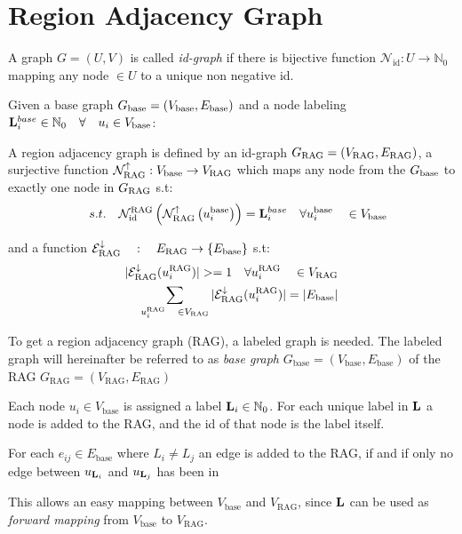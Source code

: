 \chapter{Region Adjacency Graph}\label{ch:regio_adjacency_graph}

    
  \begin{MyDef}[Id-Graph]
    A graph $G = (U, V )$ is called \emph{id-graph} if there is
    bijective function  $\mathcal{N}_{\text{id}}: U \rightarrow \mathbb{N}_0 $ 
    mapping any node $\in U$ to a unique non negative id.
  \end{MyDef}
    

  \begin{MyDef}
    Given a base graph $G_{\text{base}} = (V_{\text{base}}, E_{\text{base}})$ and 
    a node labeling $\mathbf{L}_{i}^{base} \in  \mathbb{N}_0 \quad \forall \quad u_i \in V_{\text{base}}$:

    A region adjacency graph  is defined by an id-graph  $G_{\text{RAG}} = (V_{\text{RAG}}, E_{\text{RAG}})$,
    a surjective function $ \mathcal{N}_{\text{RAG}}^{\uparrow} : V_{\text{base}} \rightarrow V_{\text{RAG}}$ which maps
    any node from the $G_{\text{base}}$ to exactly one node in $G_{\text{RAG}}$ s.t:
    \[
        \quad s.t. \quad
        \mathcal{N}_{\text{id}}^{\text{RAG}} 
        \left(
            \mathcal{N}_{\text{RAG}}^{\uparrow}
            \left(
                u_i^{\text{base}}
            \right)
        \right) 
        = \mathbf{L}_i^{base}
        \quad \forall u_i^{\text{base}} \quad \in V_{\text{base}}
    \]

    and a function $\mathcal{E}_{\text{RAG}}^{\downarrow} \quad : \quad E_{\text{RAG}} \rightarrow \{  E_{\text{base}} \} $
    s.t:
    \begin{align*}
        |\mathcal{E}_{\text{RAG}}^{\downarrow}(u_i^{\text{RAG}})| >=1 
            \quad \forall u_i^{\text{RAG}} \quad \in V_{\text{RAG}}  \\
        \sum _{u_i^{\text{RAG}} \quad \in V_{\text{RAG}} } 
            |\mathcal{E}_{\text{RAG}}^{\downarrow}(u_i^{\text{RAG}})| = |E_{\text{base}}|
    \end{align*}

  \end{MyDef}



To get a region adjacency graph (RAG), a labeled graph is needed.
The labeled graph will hereinafter be referred to as \emph{base graph} 
$G_{\text{base}}=(V_{\text{base}},E_{\text{base}})$
of the RAG $G_{\text{RAG}}=(V_{\text{RAG}},E_{\text{RAG}})$

Each node $u_i \in V_{\text{base}} $ is assigned a 
label $\mathbf{L}_{i} \in  \mathbb{N}_0$.
For each unique label in $\mathbf{L}$ a node is added to the RAG, 
and the id of that node is the label itself.

For each $e_{ij} \in E_{\text{base}}$ where $L_i \neq L_j$ an edge is added to the RAG,
if and if only no edge between $u_{\mathbf{L}_i}$ and $u_{\mathbf{L}_j}$ has been in 



This allows an easy mapping between $V_{\text{base}}$ and $V_{\text{RAG}}$, 
since $\mathbf{L}$  can be used as \emph{forward mapping} from $V_{\text{base}}$ to $V_{\text{RAG}}$.


